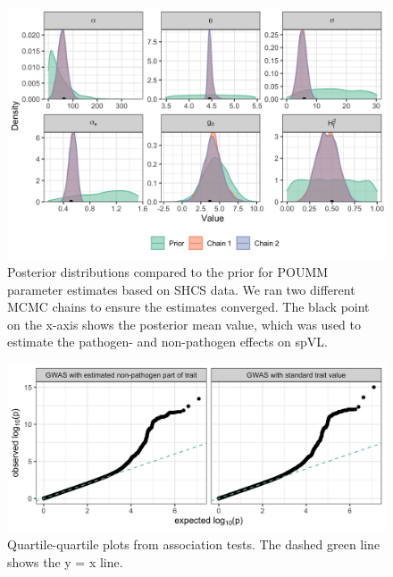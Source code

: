\documentclass[11pt]{article}
\begin{document}
\begin{doublespace}
\begin{figure}[H]
	\centering
		\includegraphics[width=0.7\linewidth]{figures/poumm_parameter_estimates.png}
		\caption{Posterior distributions compared to the prior for POUMM parameter estimates based on SHCS data. We ran two different MCMC chains to ensure the estimates converged. The black point on the x-axis shows the posterior mean value, which was used to estimate the pathogen- and non-pathogen effects on spVL.}
\label{fig:poumm-parameters}
\end{figure}

\begin{figure}[H]
	\centering
	\includegraphics[width=\linewidth]{figures/qq_plots.png}
	\caption{Quartile-quartile plots from association tests. The dashed green line shows the y = x line.}
	\label{fig:qq-plots}
\end{figure}


\end{doublespace}
\end{document}

